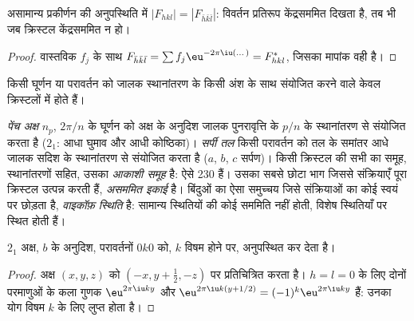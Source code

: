 \begin{proposition}[फ़्रीडेल का नियम]\label{prop:b3:x-ray-diffraction:friedel}
असामान्य प्रकीर्णन की अनुपस्थिति में $|F_{hkl}| = |F_{\bar h\bar k\bar l}|$: विवर्तन
प्रतिरूप केंद्रसममित दिखता है, तब भी जब क्रिस्टल केंद्रसममित न हो।
\end{proposition}

\begin{proof}
वास्तविक $f_j$ के साथ $F_{\bar h\bar k\bar l} = \sum f_j\eu^{-2\pi\iu(\dots)} = F_{hkl}^*$, जिसका
मापांक वही है।
\end{proof}

किसी घूर्णन या परावर्तन को जालक स्थानांतरण के किसी अंश के साथ संयोजित करने वाले
 केवल क्रिस्टलों में होते हैं।

\begin{definition}[पेंच अक्ष, सर्पी तल, आकाशी समूह]\label{def:b3:x-ray-diffraction:space-group}
\emph{पेंच अक्ष} $n_p$, $2\pi/n$ के घूर्णन को
अक्ष के अनुदिश जालक पुनरावृत्ति के $p/n$ के स्थानांतरण से संयोजित करता है ($2_1$: आधा घुमाव और
आधी कोष्ठिका)। \emph{सर्पी तल} किसी परावर्तन को
तल के समांतर आधे जालक सदिश के स्थानांतरण से संयोजित करता है ($a$, $b$, $c$ सर्पण)।
किसी क्रिस्टल की सभी  का समूह, स्थानांतरणों सहित,
उसका \emph{आकाशी समूह} है: ऐसे 230 हैं। उसका सबसे छोटा भाग
जिससे संक्रियाएँ पूरा क्रिस्टल उत्पन्न करती हैं,
\emph{असममित इकाई} है। बिंदुओं का ऐसा समुच्चय जिसे संक्रियाओं का कोई
 स्वयं पर छोड़ता है, \emph{वाइकॉफ़
स्थिति} है: सामान्य स्थितियों की कोई सममिति नहीं होती, विशेष
स्थितियाँ  पर स्थित होती हैं।
\end{definition}

\begin{proposition}[पेंच अक्ष से अनुपस्थितियाँ]\label{prop:b3:x-ray-diffraction:screw-absence}
$2_1$ अक्ष, $b$ के अनुदिश, परावर्तनों $0k0$ को, $k$ विषम होने पर, अनुपस्थित कर देता है।
\end{proposition}

\begin{proof}
अक्ष $(x, y, z)$ को $(-x, y + \frac12, -z)$ पर प्रतिचित्रित करता है। $h = l = 0$ के लिए दोनों परमाणुओं के
कला गुणक $\eu^{2\pi\iu ky}$ और $\eu^{2\pi\iu k(y + 1/2)} = (-1)^k\eu^{2\pi\iu ky}$ हैं: उनका योग
विषम $k$ के लिए लुप्त होता है।
\end{proof}

